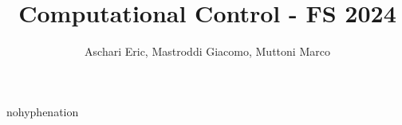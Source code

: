 \documentclass[a4paper,8pt,fleqn]{article}
\author{}
\newcommand{\1}{\frac}
\numberwithin{equation}{section}
\begin{document}
\begin{hyphenrules}{nohyphenation}

\begin{footnotesize}
\subsectionfont{\color{blue}} 
\subsubsectionfont{\color{RoyalBlue}}

\title{Computational Control - FS 2024}
\author{Aschari Eric, Mastroddi Giacomo, Muttoni Marco}
\maketitle

\tableofcontents
\end{footnotesize}

\newpage

\newpage

\newpage

\newpage

\newpage

\end{hyphenrules}
\end{document}
